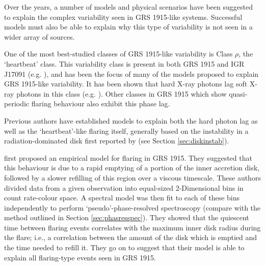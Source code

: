 \par Over the years, a number of models and physical scenarios have been suggested to explain the complex variability seen in GRS 1915-like systems.  Successful models must also be able to explain why this type of variability is not seen in a wider array of sources.
\par One of the most best-studied classes of GRS 1915-like variability is Class $\rho$, the `heartbeat' class.  This variability class is present in both GRS 1915 and IGR J17091 (e.g. \citealp{Altamirano_IGR_FH}), and has been the focus of many of the models proposed to explain GRS 1915-like variability.  It has been shown that hard X-ray photons lag soft X-ray photons in this class (e.g. \citealp{Janiuk_Lag,Massaro_Lag}).  Other classes in GRS 1915 which show quasi-periodic flaring behaviour also exhibit this phase lag.
\par Previous authors have established models to explain both the hard photon lag as well as the `heartbeat'-like flaring itself, generally based on the instability in a radiation-dominated disk first reported by \citealp{Lightman_Instability} (see Section \ref{sec:diskinstab}).
\par \citealp{Belloni_Model1} first proposed an empirical model for flaring in GRS 1915.  They suggested that this behaviour is due to a rapid emptying of a portion of the inner accretion disk, followed by a slower refilling of this region over a viscous timescale.  These authors divided data from a given observation into equal-sized 2-Dimensional bins in count rate-colour space.  A spectral model was then fit to each of these bins independently to perform `pseudo'-phase-resolved spectroscopy (compare with the method outlined in Section \ref{sec:phasresspec}).  They showed that the quiescent time between flaring events correlates with the maximum inner disk radius during the flare; i.e., a correlation between the amount of the disk which is emptied and the time needed to refill it.  They go on to suggest that their model is able to explain all flaring-type events seen in GRS 1915.
